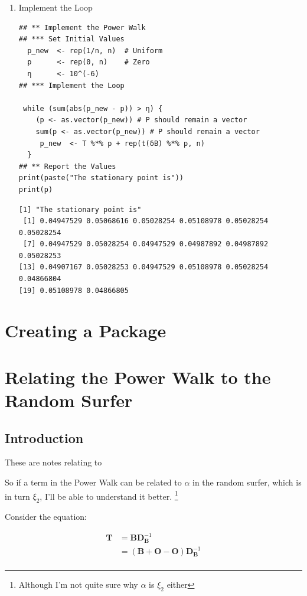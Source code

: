 \documentclass[11pt]{article}
\begin{document}
\begin{enumerate}
\item Implement the Loop
\label{sec:org54f1379}
\lstset{language=r,label= ,caption= ,captionpos=b,numbers=none}
\begin{lstlisting}
## ** Implement the Power Walk
## *** Set Initial Values
  p_new  <- rep(1/n, n)  # Uniform
  p      <- rep(0, n)    # Zero
  η      <- 10^(-6)
## *** Implement the Loop

 while (sum(abs(p_new - p)) > η) {
    (p <- as.vector(p_new)) # P should remain a vector
    sum(p <- as.vector(p_new)) # P should remain a vector
     p_new  <- T %*% p + rep(t(δB) %*% p, n)
  }
## ** Report the Values
print(paste("The stationary point is"))
print(p)
\end{lstlisting}

\begin{verbatim}
[1] "The stationary point is"
 [1] 0.04947529 0.05068616 0.05028254 0.05108978 0.05028254 0.05028254
 [7] 0.04947529 0.05028254 0.04947529 0.04987892 0.04987892 0.05028253
[13] 0.04907167 0.05028253 0.04947529 0.05108978 0.05028254 0.04866804
[19] 0.05108978 0.04866805
\end{verbatim}
\end{enumerate}

\section{Creating a Package}
\label{sec:orgde4ff20}
\section{Relating the Power Walk to the Random Surfer}
\label{relating-terms-in-power-walk-to-random-surfer}
\subsection{Introduction}
\label{sec:org184d767}
These are notes relating to \cite[]{parkPowerWalkRevisiting2013}

So if a term in the Power Walk can be related to \(\alpha\) in the random
surfer, which is in turn \(\xi_2\), I'll be able to understand it better. \footnote{Although I'm not quite sure why \(\alpha\) is \(\xi_{2}\) either}

Consider the equation:


\begin{align*}
\mathbf{T}&= \mathbf{B}\mathbf{D}_{\mathbf{B}}^{- 1} \\
&= \left( \mathbf{B}+  \mathbf{O} - \mathbf{O} \right) \mathbf{D}_{\mathbf{B}}^{- 1} \\
\end{align*}
\end{document}
